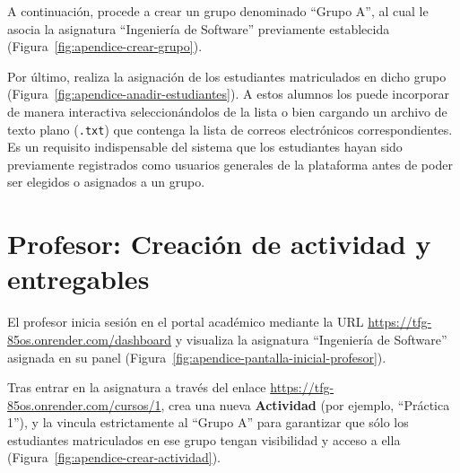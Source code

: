 A continuaci\'on, procede a crear un grupo denominado ``Grupo A'', al cual le asocia la asignatura ``Ingenier\'ia de Software'' previamente establecida (Figura~\ref{fig:apendice-crear-grupo}).


Por \'ultimo, realiza la asignaci\'on de los estudiantes matriculados en dicho grupo (Figura~\ref{fig:apendice-anadir-estudiantes}). A estos alumnos los puede incorporar de manera interactiva seleccion\'andolos de la lista o bien cargando un archivo de texto plano (\texttt{.txt}) que contenga la lista de correos electr\'onicos correspondientes. Es un requisito indispensable del sistema que los estudiantes hayan sido previamente registrados como usuarios generales de la plataforma antes de poder ser elegidos o asignados a un grupo.


\section{Profesor: Creaci\'on de actividad y entregables}

El profesor inicia sesi\'on en el portal acad\'emico mediante la URL \url{https://tfg-85os.onrender.com/dashboard} y visualiza la asignatura ``Ingenier\'ia de Software'' asignada en su panel (Figura~\ref{fig:apendice-pantalla-inicial-profesor}).


Tras entrar en la asignatura a trav\'es del enlace \url{https://tfg-85os.onrender.com/cursos/1}, crea una nueva \textbf{Actividad} (por ejemplo, ``Pr\'actica 1''), y la vincula estrictamente al ``Grupo A'' para garantizar que s\'olo los estudiantes matriculados en ese grupo tengan visibilidad y acceso a ella (Figura~\ref{fig:apendice-crear-actividad}).


